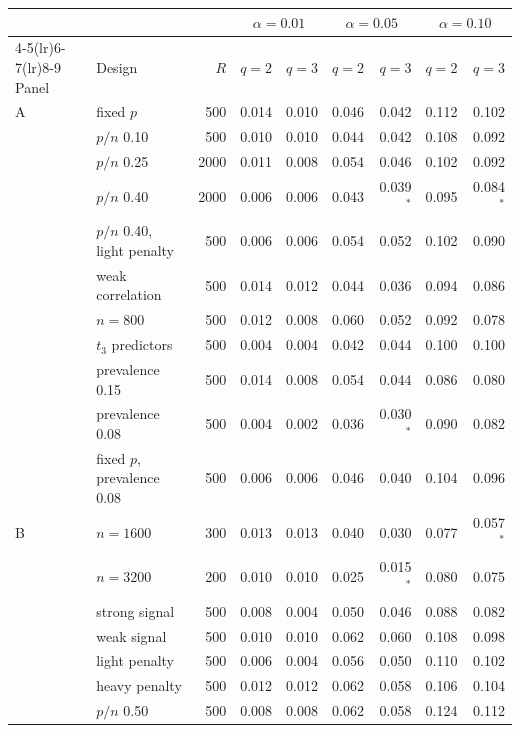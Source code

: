 \begin{tabular}{llrrrrrrr}
\toprule
 & & & \multicolumn{2}{c}{$\alpha = 0.01$} & \multicolumn{2}{c}{$\alpha = 0.05$} & \multicolumn{2}{c}{$\alpha = 0.10$} \\
\cmidrule(lr){4-5}\cmidrule(lr){6-7}\cmidrule(lr){8-9}
Panel & Design & $R$ & $q=2$ & $q=3$ & $q=2$ & $q=3$ & $q=2$ & $q=3$ \\
\midrule
A & fixed $p$ & 500 & 0.014 & 0.010 & 0.046 & 0.042 & 0.112 & 0.102 \\
 & $p/n$ 0.10 & 500 & 0.010 & 0.010 & 0.044 & 0.042 & 0.108 & 0.092 \\
 & $p/n$ 0.25 & 2000 & 0.011 & 0.008 & 0.054 & 0.046 & 0.102 & 0.092 \\
 & $p/n$ 0.40 & 2000 & 0.006 & 0.006 & 0.043 & 0.039$^*$ & 0.095 & 0.084$^*$ \\
 & $p/n$ 0.40, light penalty & 500 & 0.006 & 0.006 & 0.054 & 0.052 & 0.102 & 0.090 \\
 & weak correlation & 500 & 0.014 & 0.012 & 0.044 & 0.036 & 0.094 & 0.086 \\
 & $n = 800$ & 500 & 0.012 & 0.008 & 0.060 & 0.052 & 0.092 & 0.078 \\
 & $t_3$ predictors & 500 & 0.004 & 0.004 & 0.042 & 0.044 & 0.100 & 0.100 \\
 & prevalence 0.15 & 500 & 0.014 & 0.008 & 0.054 & 0.044 & 0.086 & 0.080 \\
 & prevalence 0.08 & 500 & 0.004 & 0.002 & 0.036 & 0.030$^*$ & 0.090 & 0.082 \\
 & fixed $p$, prevalence 0.08 & 500 & 0.006 & 0.006 & 0.046 & 0.040 & 0.104 & 0.096 \\
B & $n = 1600$ & 300 & 0.013 & 0.013 & 0.040 & 0.030 & 0.077 & 0.057$^*$ \\
 & $n = 3200$ & 200 & 0.010 & 0.010 & 0.025 & 0.015$^*$ & 0.080 & 0.075 \\
 & strong signal & 500 & 0.008 & 0.004 & 0.050 & 0.046 & 0.088 & 0.082 \\
 & weak signal & 500 & 0.010 & 0.010 & 0.062 & 0.060 & 0.108 & 0.098 \\
 & light penalty & 500 & 0.006 & 0.004 & 0.056 & 0.050 & 0.110 & 0.102 \\
 & heavy penalty & 500 & 0.012 & 0.012 & 0.062 & 0.058 & 0.106 & 0.104 \\
 & $p/n$ 0.50 & 500 & 0.008 & 0.008 & 0.062 & 0.058 & 0.124 & 0.112 \\

\end{tabular}
